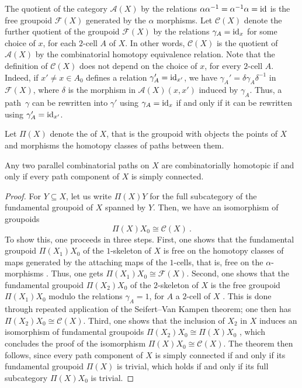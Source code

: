 The quotient of the category $\mathcal{A}(X)$ by the relations $\alpha \alpha^{-1}=\alpha^{-1}\alpha=\mathrm{id}$ is the free groupoid $\mathcal{F}(X)$ generated by the $\alpha$ morphisms.
Let $\mathcal{C}(X)$ denote the further quotient of the groupoid $\mathcal{F}(X)$ by the relations $\gamma_A=\mathrm{id}_x$ for some choice of $x$, for each $2$-cell $A$ of $X$.
In other words, $\mathcal{C}(X)$ is the quotient of $\mathcal{A}(X)$ by the combinatorial homotopy equivalence relation.
Note that the definition of $\mathcal{C}(X)$ does not depend on the choice of $x$, for every $2$-cell $A$.
Indeed, if $x'\neq x \in A_0$ defines a relation $\gamma_A'=\mathrm{id}_{x'}$, we have $\gamma_A'=\delta \gamma_A \delta^{-1}$ in $\mathcal{F}(X)$, where $\delta$ is the morphism in  $\mathcal{A}(X)(x,x')$ induced by $\gamma_A$. 
Thus, a path~$\gamma$ can be rewritten into $\gamma'$ using $\gamma_A=\mathrm{id}_x$ if and only if it can be rewritten using $\gamma_A'=\mathrm{id}_{x'}$.

Let $\Pi(X)$ denote the of $X$, that is the groupoid with objects the points of $X$ and morphisms the homotopy classes of paths between them.

\begin{thm}
\label{thm:top-coherence}
    Any two parallel combinatorial paths on $X$ are combinatorially homotopic if and only if every path component of $X$ is simply connected.
\end{thm}

\begin{proof}
    For $Y \subseteq X$, let us write $\Pi(X)Y$ for the full subcategory of the fundamental groupoid of $X$ spanned by $Y$.
    Then, we have an isomorphism of groupoids \[ \Pi(X)X_0 \cong \mathcal{C}(X) \ . \]
    To show this, one proceeds in three steps. 
    First, one shows that the fundamental groupoid $\Pi(X_1)X_0$ of the $1$-skeleton of $X$ is free on the homotopy classes of maps generated by the attaching maps of the $1$-cells, that is, free on the $\alpha$-morphisms \cite[9.1.5]{Brown2006}.
    Thus, one gets $\Pi(X_1)X_0 \cong \mathcal{F}(X)$. 
    Second, one shows that the fundamental groupoid $\Pi(X_2)X_0$ of the $2$-skeleton of $X$ is the free groupoid $\Pi(X_1)X_0$ modulo the relations $\gamma_A=1$, for $A$ a $2$-cell of $X$ \cite[9.1.6]{Brown2006}. 
    This is done through repeated application of the Seifert--Van Kampen theorem; one then has $\Pi(X_2)X_0 \cong \mathcal{C}(X)$.
    Third, one shows that the inclusion of $X_2$ in $X$ induces an isomorphism of fundamental groupoids $\Pi(X_2)X_0 \cong \Pi(X)X_0$ \cite[9.1.7]{Brown2006}, which concludes the proof of the isomorphism $\Pi(X)X_0 \cong \mathcal{C}(X)$.
    The theorem then follows, since every path component of $X$ is simply connected if and only if its fundamental groupoid $\Pi(X)$ is trivial, which holds if and only if its full subcategory $\Pi(X)X_0$ is trivial.  
\end{proof}

